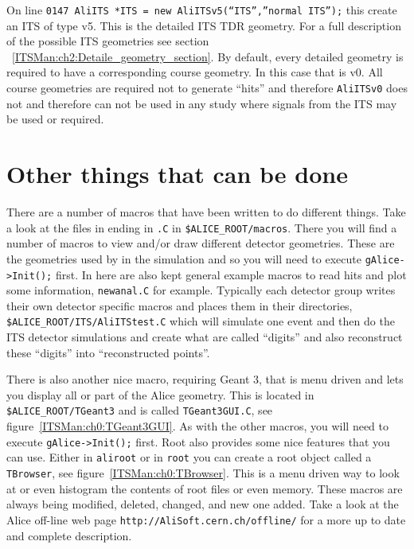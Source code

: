 On line \texttt{0147 AliITS *ITS = new AliITSv5(``ITS'',''normal ITS'');} this
create an ITS of type v5. This is the detailed ITS TDR geometry. For a full
description of the possible ITS geometries see section
~\ref{ITSMan:ch2:Detaile_geometry_section}. By default, every detailed geometry
is required to have a corresponding course geometry. In this case that is
v0. All course geometries are required not to generate ``hits'' and therefore
\texttt{AliITSv0} does not and therefore can not be used in any study where
signals from the ITS may be used or required.

\section*{Other things that can be done}

There are a number of macros that have been written to do different
things. Take a look at the files in ending in \texttt{.C} in
\texttt{\$ALICE\_ROOT/macros}. There you will find a number of macros to view
and/or draw different detector geometries. These are the geometries used by in
the simulation and so you will need to execute \texttt{gAlice->Init();}
first. In here are also kept general example macros to read hits and plot some
information, \texttt{newanal.C} for example. Typically each detector group
writes their own detector specific macros and places them in their directories,
\texttt{\$ALICE\_ROOT/ITS/AliITStest.C} which will simulate one event and then
do the ITS detector simulations and create what are called ``digits'' and also
reconstruct these ``digits'' into ``reconstructed points''.

There is also another nice macro, requiring Geant 3, that is menu driven and
lets you display all or part of the Alice geometry. This is located in
\texttt{\$ALICE\_ROOT/TGeant3} and is called \texttt{TGeant3GUI.C}, see
figure~\ref{ITSMan:ch0:TGeant3GUI}. As with the other macros, you will need to
execute \texttt{gAlice->Init();} first. Root also provides some nice features
that you can use. Either in \texttt{aliroot} or in \texttt{root} you can create
a root object called a \texttt{TBrowser}, see
figure~\ref{ITSMan:ch0:TBrowser}. This is a menu driven way to look at or even
histogram the contents of root files or even memory. These macros are always
being modified, deleted, changed, and new one added. Take a look at the Alice
off-line web page \texttt{http://AliSoft.cern.ch/offline/} for a more up to
date and complete description.

\begin{figure*}[htbp]
  \begin{center}
    \leavevmode
    \caption{This shows a typical menu from running \texttt{TGeant3GUI.C}.}
    \label{ITSMan:ch0:TGeant3GUI}
  \end{center}
\end{figure*}

\begin{figure*}[htbp]
  \begin{center}
    \leavevmode
    \caption{This shows a typical TBrowser window.}
    \label{ITSMan:ch0:TBrowser}
  \end{center}
\end{figure*}
